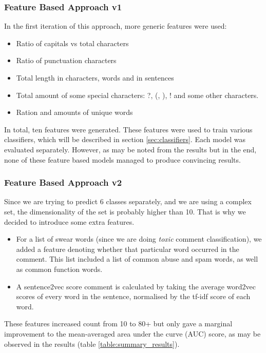 \documentclass[10pt, a4paper]{article}
\begin{document}
\begin{multicols}{2}
		\subsubsection{Feature Based Approach v1}
		In the first iteration of this approach, more generic features were used:
		\begin{itemize}
			\setlength\itemsep{0px}
			\item Ratio of capitals vs total characters
			\item Ratio of punctuation characters
			\item Total length in characters, words and in sentences
			\item Total amount of some special characters: ?, (, ), ! and some other characters.
			\item Ration and amounts of unique words		
		\end{itemize}
		In total, ten features were generated. These features were used to train various classifiers, which will be described in section \ref{sec:classifiers}. Each model was evaluated separately. However, as may be noted from the results but in the end, none of these feature based models managed to produce convincing results.
		
		
		\subsubsection{Feature Based Approach v2}
		
		
		Since we are trying to predict 6 classes separately, and we are using a  complex set, the dimensionality of the set is probably higher than 10. That is why we decided to introduce some extra features.
		
		\begin{itemize}
			\item For a list of swear words (since we are doing \emph{toxic} comment classification), we added a feature denoting whether that particular word occurred in the comment. This list included a list of common abuse and spam words, as well as common function words.
			\item  A sentence2vec score comment is calculated by taking the average word2vec scores of every word in the sentence, normalised by the tf-idf score of each word.
		\end{itemize}
		These features increased count from 10 to 80+ but only gave a marginal improvement to the mean-averaged area under the curve (AUC) score, as may be observed in the results (table \ref{table:summary_results}).
		

\end{multicols}
\end{document}
